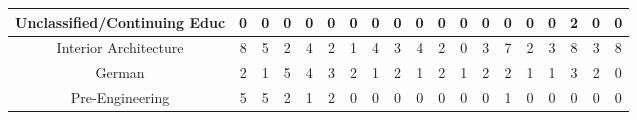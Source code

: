 \documentclass[10]{article}
\begin{document}
\begin{landscape}
\begin{longtable}[c]{|ccccccccccccccccccc|}
	\multicolumn{1}{|c|}{Unclassified/Continuing Educ}               & \multicolumn{1}{c|}{0}          & \multicolumn{1}{c|}{0}          & \multicolumn{1}{c|}{0}          & \multicolumn{1}{c|}{0}          & \multicolumn{1}{c|}{0}          & \multicolumn{1}{c|}{0}          & \multicolumn{1}{c|}{0}          & \multicolumn{1}{c|}{0}          & \multicolumn{1}{c|}{0}          & \multicolumn{1}{c|}{0}          & \multicolumn{1}{c|}{0}          & \multicolumn{1}{c|}{0}          & \multicolumn{1}{c|}{0}          & \multicolumn{1}{c|}{0}          & \multicolumn{1}{c|}{0}          & \multicolumn{1}{c|}{2}          & \multicolumn{1}{c|}{0}          & 0          \\ \hline
	\multicolumn{1}{|c|}{Interior Architecture}                      & \multicolumn{1}{c|}{8}          & \multicolumn{1}{c|}{5}          & \multicolumn{1}{c|}{2}          & \multicolumn{1}{c|}{4}          & \multicolumn{1}{c|}{2}          & \multicolumn{1}{c|}{1}          & \multicolumn{1}{c|}{4}          & \multicolumn{1}{c|}{3}          & \multicolumn{1}{c|}{4}          & \multicolumn{1}{c|}{2}          & \multicolumn{1}{c|}{0}          & \multicolumn{1}{c|}{3}          & \multicolumn{1}{c|}{7}          & \multicolumn{1}{c|}{2}          & \multicolumn{1}{c|}{3}          & \multicolumn{1}{c|}{8}          & \multicolumn{1}{c|}{3}          & 8          \\ \hline
	\multicolumn{1}{|c|}{German}                                     & \multicolumn{1}{c|}{2}          & \multicolumn{1}{c|}{1}          & \multicolumn{1}{c|}{5}          & \multicolumn{1}{c|}{4}          & \multicolumn{1}{c|}{3}          & \multicolumn{1}{c|}{2}          & \multicolumn{1}{c|}{1}          & \multicolumn{1}{c|}{2}          & \multicolumn{1}{c|}{1}          & \multicolumn{1}{c|}{2}          & \multicolumn{1}{c|}{1}          & \multicolumn{1}{c|}{2}          & \multicolumn{1}{c|}{2}          & \multicolumn{1}{c|}{1}          & \multicolumn{1}{c|}{1}          & \multicolumn{1}{c|}{3}          & \multicolumn{1}{c|}{2}          & 0          \\ \hline
	\multicolumn{1}{|c|}{Pre-Engineering}                            & \multicolumn{1}{c|}{5}          & \multicolumn{1}{c|}{5}          & \multicolumn{1}{c|}{2}          & \multicolumn{1}{c|}{1}          & \multicolumn{1}{c|}{2}          & \multicolumn{1}{c|}{0}          & \multicolumn{1}{c|}{0}          & \multicolumn{1}{c|}{0}          & \multicolumn{1}{c|}{0}          & \multicolumn{1}{c|}{0}          & \multicolumn{1}{c|}{0}          & \multicolumn{1}{c|}{0}          & \multicolumn{1}{c|}{1}          & \multicolumn{1}{c|}{0}          & \multicolumn{1}{c|}{0}          & \multicolumn{1}{c|}{0}          & \multicolumn{1}{c|}{0}          & 0          \\ \hline

\end{longtable}
\end{landscape}
\end{document}
